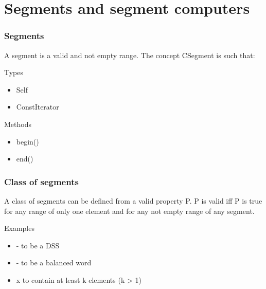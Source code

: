 
\section{Segments and segment computers}

\begin{frame}
  \frametitle{Segments}
 

A segment is a valid and not empty range. 
The concept CSegment is such that: 

  \begin{block}{Types}
\begin{itemize}
  \item Self
  \item ConstIterator
\end{itemize}
  \end{block}

  \begin{block}{Methods}
\begin{itemize}
  \item begin()
  \item end()
\end{itemize}
  \end{block}

\end{frame}

\begin{frame}
  \frametitle{Class of segments}
 
A class of segments can be defined from a valid property P. 
P is valid iff P is true for any range of only one element
and for any not empty range of any segment. 

  \begin{block}{Examples}
\begin{itemize}
  \item - to be a DSS
  \item - to be a balanced word
  \item x to contain at least k elements (k > 1)
\end{itemize}
  \end{block}

\end{frame}

